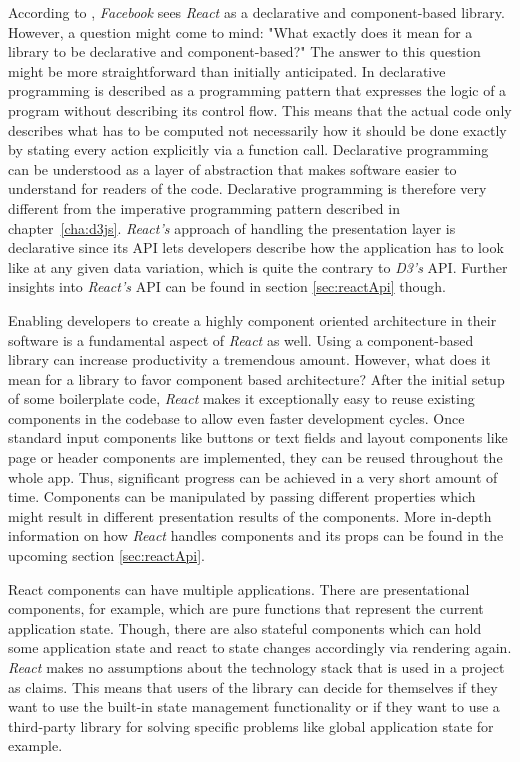 According to \cite{React}, \emph{Facebook} sees \emph{React} as a declarative and component-based library. However, a question might come to mind: "What exactly does it mean for a library to be declarative and component-based?" The answer to this question might be more straightforward than initially anticipated. In \cite{lloyd1994practical} declarative programming is described as a programming pattern that expresses the logic of a program without describing its control flow. This means that the actual code only describes what has to be computed not necessarily how it should be done exactly by stating every action explicitly via a function call. Declarative programming can be understood as a layer of abstraction that makes software easier to understand for readers of the code. Declarative programming is therefore very different from the imperative programming pattern described in chapter~\ref{cha:d3js}. \emph{React's} approach of handling the presentation layer is declarative since its API lets developers describe how the application has to look like at any given data variation, which is quite the contrary to \emph{D3's} API. Further insights into \emph{React's} API can be found in section \ref{sec:reactApi} though.

Enabling developers to create a highly component oriented architecture in their software is a fundamental aspect of \emph{React} as well. Using a component-based library can increase productivity a tremendous amount. However, what does it mean for a library to favor component based architecture? After the initial setup of some boilerplate code, \emph{React} makes it exceptionally easy to reuse existing components in the codebase to allow even faster development cycles. Once standard input components like buttons or text fields and layout components like page or header components are implemented, they can be reused throughout the whole app. Thus, significant progress can be achieved in a very short amount of time. Components can be manipulated by passing different properties which might result in different presentation results of the components. More in-depth information on how \emph{React} handles components and its props can be found in the upcoming section \ref{sec:reactApi}.

React components can have multiple applications. There are presentational components, for example, which are pure functions that represent the current application state. Though, there are also stateful components which can hold some application state and react to state changes accordingly via rendering again. \emph{React} makes no assumptions about the technology stack that is used in a project as \cite{React} claims. This means that users of the library can decide for themselves if they want to use the built-in state management functionality or if they want to use a third-party library for solving specific problems like global application state for example.

